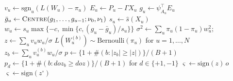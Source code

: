 \documentclass[pdflatex,sn-mathphys-num]{sn-jnl}%
\theoremstyle{thmstyleone}%
\theoremstyle{thmstyletwo}%
\theoremstyle{thmstylethree}%
\begin{document}
\begin{algorithm}[tbp]
\begin{algorithmic}[1]
  \State $v_u \gets \mathrm{sgn}_u (L(W_u) - \pi_u)$
  \State $E_u \gets P_u - \Gamma X_u$ 
  \State $g_u \gets \psi_{A_u}^{\top} E_u$ 
  \State $\bar g_u \gets \textsc{Centre}(g_1, \dots, g_{u-1}; \nu_0, \nu_1)$ 
  \State $s_u \gets \hat s(X_u)$
  \State $w_u \gets s_u \max\{-c, \min\{c, (g_u - \bar g_u) / s_u\}\}$
\EndFor
\State $\sigma^2 \gets \sum_u \pi_u(1 - \pi_u)w_u^2$; $z \gets \sum_u v_u w_u / \sigma$
  \State $L(W_u^{(b)}) \sim \mathrm{Bernoulli}(\pi_u)$ for $u = 1, \dots, N$ 
  \State $z_b \gets \sum_u v_u^{(b)} w_u / \sigma$
\EndFor
\State $p \gets \{1 + \#(b: |z_b| \ge |z|)\}/(B + 1)$
  \State $p_d \gets \{1 + \#(b: d o z_b \ge d o z)\}/(B + 1)$ for $d \in \{+1, -1\}$
  \State $\varsigma \gets \mathrm{sign}(z)\, o$
\Else
  \State $\varsigma \gets \mathrm{sign}(z^{\circ})$ 
\EndIf
\end{algorithmic}
\end{algorithm}
\end{document}
